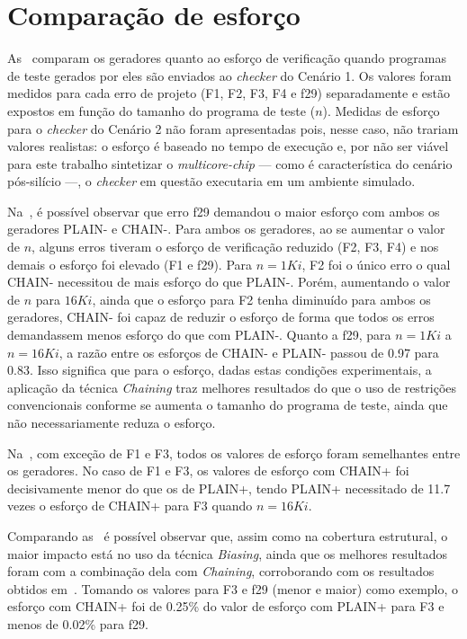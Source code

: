 \section{Comparação de esforço}

As~ comparam os geradores quanto ao
esforço de verificação quando programas de teste gerados por eles são enviados
ao \textit{checker} do Cenário 1. Os valores foram medidos para cada erro de
projeto (F1, F2, F3, F4 e f29) separadamente e estão expostos em função do
tamanho do programa de teste ($n$). Medidas de esforço para o \textit{checker}
do Cenário 2 não foram apresentadas pois, nesse caso, não trariam valores
realistas: o esforço é baseado no tempo de execução e, por não ser viável para
este trabalho sintetizar o \textit{multicore-chip} --- como é característica do
cenário pós-silício ---, o \textit{checker} em questão executaria em um
ambiente simulado.



Na~, é possível observar que erro f29 demandou o maior
esforço com ambos os geradores PLAIN- e CHAIN-. Para ambos os geradores, ao se
aumentar o valor de $n$, alguns erros tiveram o esforço de verificação reduzido
(F2, F3, F4) e nos demais o esforço foi elevado (F1 e f29). Para $n = 1Ki$, F2
foi o único erro o qual CHAIN- necessitou de mais esforço do que PLAIN-. Porém,
aumentando o valor de $n$ para $16Ki$, ainda que o esforço para F2 tenha
diminuído para ambos os geradores, CHAIN- foi capaz de reduzir o esforço de
forma que todos os erros demandassem menos esforço do que com PLAIN-. Quanto a
f29, para $n = 1Ki$ a $n = 16Ki$, a razão entre os esforços de CHAIN- e PLAIN-
passou de 0.97 para 0.83. Isso significa que para o esforço, dadas estas
condições experimentais, a aplicação da técnica \textit{Chaining} traz melhores
resultados do que o uso de restrições convencionais conforme se aumenta o
tamanho do programa de teste, ainda que não necessariamente reduza o esforço.



Na~, com exceção de F1 e F3, todos os valores de esforço
foram semelhantes entre os geradores. No caso de F1 e F3, os valores de esforço
com CHAIN+ foi decisivamente menor do que os de PLAIN+, tendo PLAIN+
necessitado de 11.7 vezes o esforço de CHAIN+ para F3 quando $n = 16Ki$.

Comparando as~ é possível observar
que, assim como na cobertura estrutural, o maior impacto está no uso da técnica
\textit{Biasing}, ainda que os melhores resultados foram com a combinação dela
com \textit{Chaining}, corroborando com os resultados obtidos
em~\cite{Andrade:2019}. Tomando os valores para F3 e f29 (menor e maior) como
exemplo, o esforço com CHAIN+ foi de 0.25\% do valor de esforço com PLAIN+ para
F3 e menos de 0.02\% para f29.

